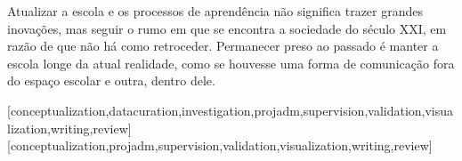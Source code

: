 \documentclass{textolivre}
\begin{document}
Atualizar a escola e os processos de aprendência não significa trazer grandes inovações, mas seguir o rumo em que se encontra a sociedade do século XXI, em razão de que não há como retroceder. Permanecer preso ao passado é manter a escola longe da atual realidade, como se houvesse uma forma de comunicação fora do espaço escolar e outra, dentro dele.



\printbibliography\label{sec-bib}

\begin{contributors}
[conceptualization,datacuration,investigation,projadm,supervision,validation,visualization,writing,review]
[conceptualization,projadm,supervision,validation,visualization,writing,review]
\end{contributors}
\end{document}
